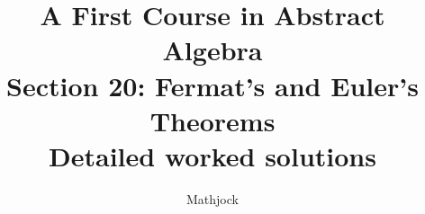 
\title{\textbf{A First Course in Abstract Algebra}\\[0.3em]Section 20: Fermat's and Euler's Theorems\\[0.3em]\large Detailed worked solutions}
\author{Mathjock}
\date{}

\maketitle
\bookinfo
\tableofcontents
\clearpage
\renewcommand{\thesection}{20}
\renewcommand{\theHsection}{fraleigh.20}


